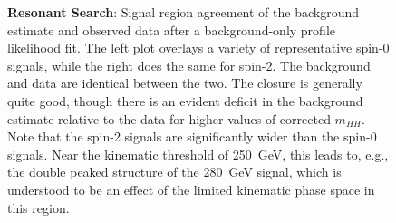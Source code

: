 \begin{figure}[ht]
  \centering
  \caption{\label{fig:res-sr-mhh} \textbf{Resonant Search}: Signal region agreement of the background estimate and 
  observed data after a background-only profile likelihood fit. The left plot overlays a variety of representative 
  spin-0 signals, while the right does the same for spin-2. The background and data are identical between the two. 
  The closure is generally quite good, though there is an evident deficit in the background estimate relative to the 
  data for higher values of corrected $m_{HH}$. Note that the spin-2 signals are significantly wider than the spin-0 
  signals. Near the kinematic threshold of \SI{250}{\GeV}, this leads to, e.g., the double peaked structure of the 
  \SI{280}{\GeV} signal, which is understood to be an effect of the limited kinematic phase space in this region.}
\end{figure}

\FloatBarrier
